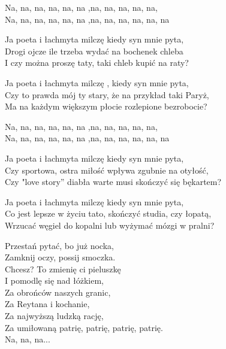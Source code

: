 \begin{text}
    \vin Na, na, na, na, na, na ,na, na, na, na, na,\\
    \vin Na, na, na, na, na, na ,na, na, na, na, na, na

    Ja poeta i łachmyta milczę kiedy syn mnie pyta,\\
    Drogi ojcze ile trzeba wydać na bochenek chleba\\
    I czy można proszę taty, taki chleb kupić na raty?

    Ja poeta i łachmyta milczę , kiedy syn mnie pyta,\\
    Czy to prawda mój ty stary, że na przykład taki Paryż,\\
    Ma na każdym większym płocie rozlepione bezrobocie?

    \vin Na, na, na, na, na, na ,na, na, na, na, na,\\
    \vin Na, na, na, na, na, na ,na, na, na, na, na, na

    Ja poeta i łachmyta milczę kiedy syn mnie pyta,\\
    Czy sportowa, ostra miłość wpływa zgubnie na otyłość,\\
    Czy "love story” diabła warte musi skończyć się bękartem?

    Ja poeta i łachmyta milczę kiedy syn mnie pyta,\\
    Co jest lepsze w życiu tato, skończyć studia, czy łopatą,\\
    Wrzucać węgiel do kopalni lub wyżymać mózgi w pralni?

    Przestań pytać, bo już nocka,\\
    Zamknij oczy, possij smoczka.\\
    Chcesz? To zmienię ci pieluszkę\\
    I pomodlę się nad łóżkiem,\\
    Za obrońców naszych granic,\\
    Za Reytana i kochanie,\\
    Za najwyższą ludzką rację,\\
    Za umiłowaną patrię, patrię, patrię, patrię.\\
    Na, na, na...
\end{text}
